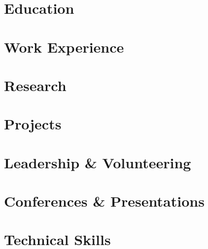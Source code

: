 \documentclass[letterpaper,11pt]{article}
\begin{document}

\section{Education}

\section{Work Experience}

\section{Research}

\section{Projects}

\section{Leadership \& Volunteering}

\section{Conferences \& Presentations}

\section{Technical Skills}

\end{document}
